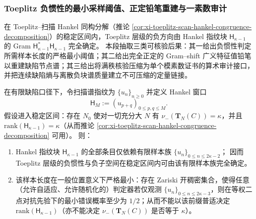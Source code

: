 \subsubsection{Toeplitz 负惯性的最小采样阈值、正定铅笔重建与一素数审计}\label{subsubsec:xi-toeplitz-minimal-sampling-gramshift-one-prime}
在 Toeplitz--扫描 Hankel 同构分解（推论 \ref{cor:xi-toeplitz-scan-hankel-congruence-decomposition}）的稳定区间内，Toeplitz 层级的负方向由 Hankel 指纹块 \(\mathsf H_{\kappa-1}\) 的 Gram \(\mathsf H_{\kappa-1}^\ast\mathsf H_{\kappa-1}\) 完全确定。
本段抽取三类可核验后果：其一给出负惯性判定所需样本长度的严格最小阈值；其二给出完全正定的 Gram--shift 广义特征值铅笔以重建缺陷节点谱；其三给出将满秩核验压缩为单个模素数证书的算术审计接口，并把连续缺陷熵与离散负块谱质量建立不可压缩的定量链接。

\begin{theorem}[负惯性判定的最小采样阈值]\label{thm:xi-toeplitz-negative-inertia-minimal-sampling}
在有限缺陷口径下，令扫描谱指纹为 \(\{u_n\}_{n\ge 0}\) 并定义 Hankel 窗口
\[
\mathsf H_M:=(u_{p+q})_{0\le p,q\le M}.
\]
假设进入稳定区间：存在 \(N_0\) 使对一切充分大 \(N\) 有 \(\nu_-(\mathbf{T}_N(C))=\kappa\)，并且 \(\mathrm{rank}(\mathsf H_{\kappa-1})=\kappa\)（从而推论 \ref{cor:xi-toeplitz-scan-hankel-congruence-decomposition} 可用）。
则：
\begin{enumerate}
  \item Hankel 指纹块 \(\mathsf H_{\kappa-1}\) 的全部条目仅依赖有限样本族 \(\{u_n\}_{0\le n\le 2\kappa-2}\)；
  因而 Toeplitz 层级的负惯性与负子空间在稳定区间内可由该有限样本族完全确定。
  \item 该样本长度在一般位置意义下严格最小：存在 Zariski 开稠密集合，使得任意（允许自适应、允许随机化的）判定器若仅观测 \(\{u_n\}_{0\le n\le 2\kappa-3}\)，则在等权二点对抗先验下的最小错误概率至少为 \(1/2\)；从而不能以该前缀普适决定 \(\mathrm{rank}(\mathsf H_{\kappa-1})\)（亦不能决定 \(\nu_-(\mathbf{T}_N(C))\) 是否等于 \(\kappa\)）。
\end{enumerate}
\end{theorem}

